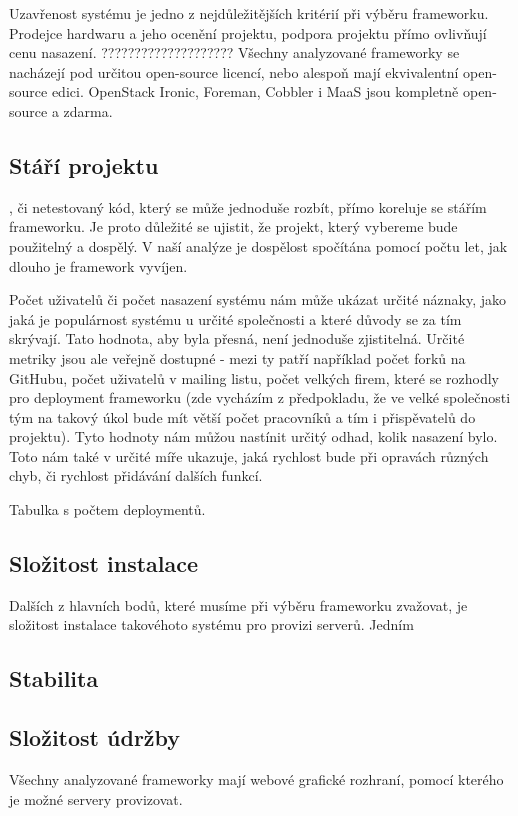 \documentclass[thesis=B,czech]{FITthesis}[2012/06/26]
\begin{document}
Uzavřenost systému je jedno z nejdůležitějších kritérií při výběru frameworku. Prodejce hardwaru a jeho ocenění projektu, podpora projektu přímo ovlivňují cenu nasazení. ????????????????????  Všechny analyzované frameworky se nacházejí pod určitou open-source licencí, nebo alespoň mají ekvivalentní open-source edici.
OpenStack Ironic, Foreman, Cobbler i MaaS jsou kompletně open-source a zdarma.


\subsection{Stáří projektu}

, či netestovaný kód, který se může jednoduše rozbít, přímo koreluje se stářím frameworku. Je proto důležité se ujistit, že projekt, který vybereme bude použitelný a dospělý.  V naší analýze je dospělost spočítána pomocí počtu let, jak dlouho je framework vyvíjen.

Počet uživatelů či počet nasazení systému nám může ukázat určité náznaky, jako jaká je populárnost systému u určité společnosti a které důvody se za tím skrývají. Tato hodnota, aby byla přesná, není jednoduše zjistitelná. Určité metriky jsou ale veřejně dostupné - mezi ty patří například počet forků na GitHubu, počet uživatelů v mailing listu, počet velkých firem, které se rozhodly pro deployment frameworku (zde vycházím z předpokladu, že ve velké společnosti tým na takový úkol bude mít větší počet pracovníků a tím i přispěvatelů do projektu). Tyto hodnoty nám můžou nastínit určitý odhad, kolik nasazení bylo. Toto nám také v určité míře ukazuje, jaká rychlost bude při opravách různých chyb, či rychlost přidávání dalších funkcí.

Tabulka s počtem deploymentů.


\subsection{Složitost instalace}

Dalších z hlavních bodů, které musíme při výběru frameworku zvažovat, je složitost instalace takovéhoto systému pro provizi serverů. Jedním 

\subsection{Stabilita}


\subsection{Složitost údržby}
Všechny analyzované frameworky mají webové grafické rozhraní, pomocí kterého je možné servery provizovat. 
\end{document}
